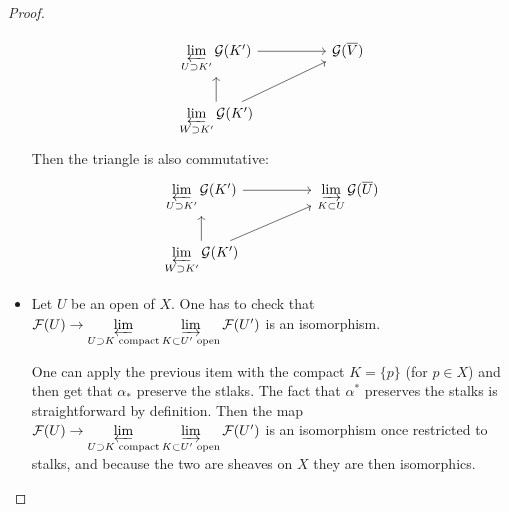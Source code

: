 \begin{proof}
\begin{itemize}
\[\begin{tikzcd}
	{\varprojlim\limits_{U\supset K'}\mathcal{G}(K')} && {\mathcal{G}(\overline{V})} \\
	{\varprojlim\limits_{W\supset K'}\mathcal{G}(K')}
	\arrow[from=1-1, to=1-3]
	\arrow[from=2-1, to=1-1]
	\arrow[from=2-1, to=1-3]
\end{tikzcd}\]
    Then the triangle is also commutative:%
    \[\begin{tikzcd}
        {\varprojlim\limits_{U\supset K'}\mathcal{G}(K')} && {\varinjlim\limits_{K\subset U}\mathcal{G}(\overline{U})} \\
        {\varprojlim\limits_{W\supset K'}\mathcal{G}(K')}
        \arrow[from=1-1, to=1-3]
        \arrow[from=2-1, to=1-1]
        \arrow[from=2-1, to=1-3]
    \end{tikzcd}\]









        \item Let $U$ be an open of $X$. One has to check that $\mathcal{F}(U)\to \varprojlim\limits_{U\supset K \text{ compact}}\varinjlim\limits_{K\subset U' \text{ open}}\mathcal{F}(U')$ is an isomorphism.

        One can apply the previous item with the compact $K=\{p\}$ (for $p\in X$) and then get that $\alpha_*$ preserve the stlaks. The fact that $\alpha^*$ preserves the stalks is straightforward by definition. Then the map $\mathcal{F}(U)\to \varprojlim\limits_{U\supset K \text{ compact}}\varinjlim\limits_{K\subset U' \text{ open}}\mathcal{F}(U')$ is an isomorphism once restricted to stalks, and because the two are sheaves on $X$ they are then isomorphics.
    \end{itemize}
\end{proof}